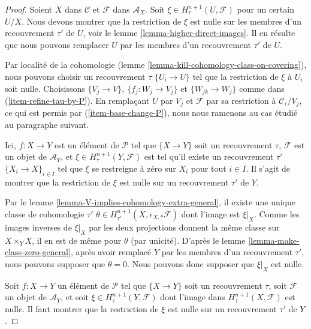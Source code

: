 \begin{proof}
Soient $X$ dans $\mathcal{C}$ et $\mathcal{F}$ dans $\mathcal{A}_X$.
Soit $\xi \in H^{n + 1}_\tau(U, \mathcal{F})$ pour un certain $U/X$.
Nous devons montrer que la restriction de $\xi$ est nulle sur les membres
d'un recouvrement $\tau'$ de $U$, voir le
lemme \ref{lemma-higher-direct-images}.
Il en résulte que nous pouvons remplacer $U$ par les membres d'un
recouvrement $\tau'$ de $U$.

\medskip\noindent
Par localité de la cohomologie
(lemme \ref{lemma-kill-cohomology-class-on-covering}),
nous pouvons choisir un recouvrement $\tau$ $\{U_i \to U\}$
tel que la restriction de $\xi$ à $U_i$ soit nulle.
Choisissons $\{V_j \to V\}$, $\{f_j : W_j \to V_j\}$ et
$\{W_{jk} \to W_j\}$ comme dans (\ref{item-refine-tau-by-P}).
En remplaçant $U$ par $V_j$ et $\mathcal{F}$ par sa restriction à
$\mathcal{C}_\tau/V_j$, ce qui est permis par
(\ref{item-base-change-P}), nous nous ramenons au cas étudié au paragraphe
suivant.

\medskip\noindent
Ici, $f : X \to Y$ est un élément de $\mathcal{P}$ tel que
$\{X \to Y\}$ soit un recouvrement $\tau$,
$\mathcal{F}$ est un objet de $\mathcal{A}_Y$, et
$\xi \in H^{n + 1}_\tau(Y, \mathcal{F})$ est tel qu'il existe un
recouvrement $\tau'$ $\{X_i \to X\}_{i \in I}$ tel que $\xi$ se restreigne
à zéro sur $X_i$ pour tout $i \in I$.
Il s'agit de montrer que la restriction de $\xi$ est nulle sur un
recouvrement $\tau'$ de $Y$.

\medskip\noindent
Par le lemme \ref{lemma-V-implies-cohomology-extra-general}, il existe une
unique classe de cohomologie $\tau'$
$\theta \in H^{n + 1}_{\tau'}(X, \epsilon_{X, *}\mathcal{F})$
dont l'image est $\xi|_X$.
Comme les images inverses de $\xi|_X$ par les deux projections donnent la
même classe sur $X \times_Y X$, il en est de même pour $\theta$
(par unicité).
D'après le lemme \ref{lemma-make-class-zero-general}, après avoir remplacé
$Y$ par les membres d'un recouvrement $\tau'$, nous pouvons supposer que
$\theta = 0$. Nous pouvons donc supposer que $\xi|_X$ est nulle.

\medskip\noindent
Soit $f : X \to Y$ un élément de $\mathcal{P}$ tel que
$\{X \to Y\}$ soit un recouvrement $\tau$,
soit $\mathcal{F}$ un objet de $\mathcal{A}_Y$, et soit
$\xi \in H^{n + 1}_\tau(Y, \mathcal{F})$ dont l'image dans
$H^{n + 1}_\tau(X, \mathcal{F})$ est nulle.
Il faut montrer que la restriction de $\xi$ est nulle sur un recouvrement
$\tau'$ de $Y$.


\end{proof}
